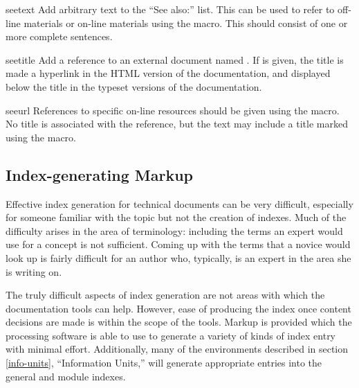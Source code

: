 \documentclass{howto}
\begin{document}
    \begin{macrodesc}{seetext}{}
      Add arbitrary text  to the ``See also:'' list.  This
      can be used to refer to off-line materials or on-line materials
      using the  macro.  This should consist of one or more
      complete sentences.
    \end{macrodesc}

    \begin{macrodesc}{seetitle}{}
      Add a reference to an external document named .  If
       is given, the title is made a hyperlink in the HTML
      version of the documentation, and displayed below the title in
      the typeset versions of the documentation.
    \end{macrodesc}

    \begin{macrodesc}{seeurl}{}
      References to specific on-line resources should be given using
      the  macro.  No title is associated with the
      reference, but the  text may include a title marked
      using the  macro.
    \end{macrodesc}


  \subsection{Index-generating Markup \label{indexing}}

    Effective index generation for technical documents can be very
    difficult, especially for someone familiar with the topic but not
    the creation of indexes.  Much of the difficulty arises in the
    area of terminology: including the terms an expert would use for a
    concept is not sufficient.  Coming up with the terms that a novice
    would look up is fairly difficult for an author who, typically, is
    an expert in the area she is writing on.

    The truly difficult aspects of index generation are not areas with
    which the documentation tools can help.  However, ease
    of producing the index once content decisions are made is within
    the scope of the tools.  Markup is provided which the processing
    software is able to use to generate a variety of kinds of index
    entry with minimal effort.  Additionally, many of the environments
    described in section \ref{info-units}, ``Information Units,'' will
    generate appropriate entries into the general and module indexes.
\end{document}
